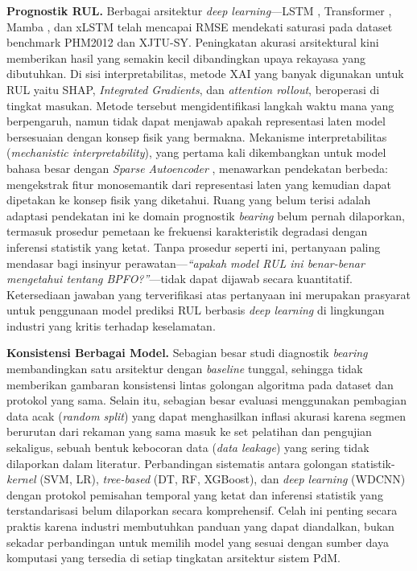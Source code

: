 \textbf{Prognostik RUL.}
Berbagai arsitektur \emph{deep learning}---LSTM ,
Transformer , Mamba ,
dan xLSTM  telah mencapai RMSE mendekati saturasi
pada dataset benchmark PHM2012 dan XJTU-SY.
Peningkatan akurasi arsitektural kini memberikan hasil yang semakin kecil
dibandingkan upaya rekayasa yang dibutuhkan.
Di sisi interpretabilitas, metode XAI yang banyak digunakan untuk RUL yaitu SHAP,
\emph{Integrated Gradients}, dan \emph{attention rollout}, beroperasi
di tingkat masukan. Metode tersebut mengidentifikasi langkah waktu mana yang
berpengaruh, namun tidak dapat menjawab apakah representasi laten model
bersesuaian dengan konsep fisik yang bermakna.
Mekanisme interpretabilitas (\emph{mechanistic interpretability}), yang
pertama kali dikembangkan untuk model bahasa besar dengan \emph{Sparse
Autoencoder} {\color{blue}}, menawarkan pendekatan
berbeda: mengekstrak fitur monosemantik dari representasi laten yang
kemudian dapat dipetakan ke konsep fisik yang diketahui.
Ruang yang belum terisi adalah adaptasi pendekatan ini ke domain
prognostik \emph{bearing} belum pernah dilaporkan, termasuk prosedur
pemetaan ke frekuensi karakteristik degradasi dengan inferensi statistik
yang ketat.
Tanpa prosedur seperti ini, pertanyaan paling mendasar bagi insinyur
perawatan---{\color{blue}\emph{``apakah model RUL ini benar-benar mengetahui tentang
BPFO?''}}---tidak dapat dijawab secara kuantitatif.
Ketersediaan jawaban yang terverifikasi atas pertanyaan ini merupakan
prasyarat untuk penggunaan model prediksi RUL berbasis \emph{deep
learning} di lingkungan industri yang kritis terhadap keselamatan.

\textbf{Konsistensi Berbagai Model.}
Sebagian besar studi diagnostik \emph{bearing} membandingkan satu arsitektur
dengan \emph{baseline} tunggal, sehingga tidak memberikan gambaran konsistensi
lintas golongan algoritma pada dataset dan protokol yang sama.
Selain itu, sebagian besar evaluasi menggunakan pembagian data acak
(\emph{random split}) yang dapat menghasilkan inflasi akurasi karena segmen
berurutan dari rekaman yang sama masuk ke set pelatihan dan pengujian
sekaligus, sebuah bentuk kebocoran data (\emph{data leakage}) yang sering
tidak dilaporkan dalam literatur.
Perbandingan sistematis antara golongan statistik-\emph{kernel} (SVM, LR),
\emph{tree-based} (DT, RF, XGBoost), dan \emph{deep learning} (WDCNN) dengan
protokol pemisahan temporal yang ketat dan inferensi statistik yang terstandarisasi
belum dilaporkan secara komprehensif.
Celah ini penting secara praktis karena industri membutuhkan panduan
yang dapat diandalkan, bukan sekadar perbandingan untuk
memilih model yang sesuai dengan sumber daya komputasi yang tersedia di setiap
tingkatan arsitektur sistem PdM.

